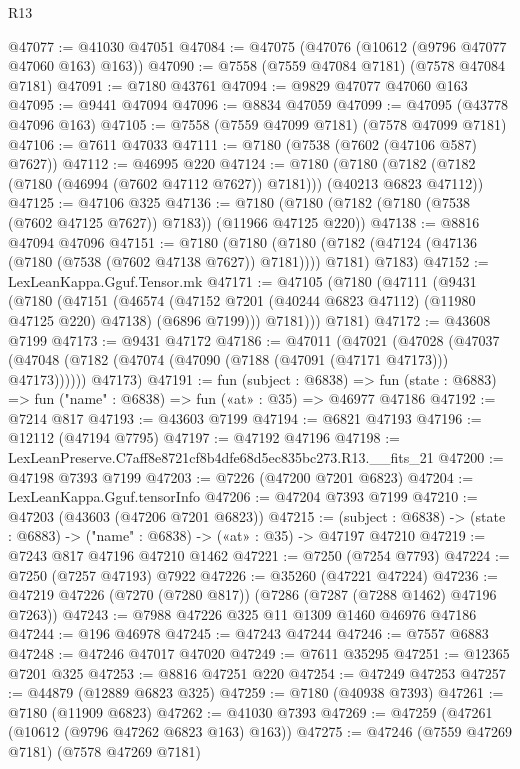 \begin{lexlean}{R13}
\begin{coremodule}
@47077 := @41030 @47051
@47084 := @47075 (@47076 (@10612 (@9796 @47077 @47060 @163) @163))
@47090 := @7558 (@7559 @47084 @7181) (@7578 @47084 @7181)
@47091 := @7180 @43761
@47094 := @9829 @47077 @47060 @163
@47095 := @9441 @47094
@47096 := @8834 @47059
@47099 := @47095 (@43778 @47096 @163)
@47105 := @7558 (@7559 @47099 @7181) (@7578 @47099 @7181)
@47106 := @7611 @47033
@47111 := @7180 (@7538 (@7602 (@47106 @587) @7627))
@47112 := @46995 @220
@47124 := @7180
    (@7180 (@7182 (@7182 (@7180 (@46994 (@7602 @47112 @7627)) @7181))) (@40213 @6823 @47112))
@47125 := @47106 @325
@47136 := @7180 (@7180 (@7182 (@7180 (@7538 (@7602 @47125 @7627)) @7183)) (@11966 @47125 @220))
@47138 := @8816 @47094 @47096
@47151 := @7180
    (@7180 (@7180 (@7182 (@47124 (@47136 (@7180 (@7538 (@7602 @47138 @7627)) @7181)))) @7181) @7183)
@47152 := LexLeanKappa.Gguf.Tensor.mk
@47171 := @47105
    (@7180
      (@47111
        (@9431
          (@7180
            (@47151
              (@46574
                (@47152 @7201 (@40244 @6823 @47112) (@11980 @47125 @220) @47138)
                (@6896 @7199)))
            @7181)))
      @7181)
@47172 := @43608 @7199
@47173 := @9431 @47172
@47186 := @47011
    (@47021
      (@47028 (@47037 (@47048 (@7182 (@47074 (@47090 (@7188 (@47091 (@47171 @47173))) @47173))))))
      @47173)
@47191 := fun (subject : @6838) =>
  fun (state : @6883) => fun ("name" : @6838) => fun («at» : @35) => @46977 @47186
@47192 := @7214 @817
@47193 := @43603 @7199
@47194 := @6821 @47193
@47196 := @12112 (@47194 @7795)
@47197 := @47192 @47196
@47198 := LexLeanPreserve.C7aff8e8721cf8b4dfe68d5ec835bc273.R13.__fits_21
@47200 := @47198 @7393 @7199
@47203 := @7226 (@47200 @7201 @6823)
@47204 := LexLeanKappa.Gguf.tensorInfo
@47206 := @47204 @7393 @7199
@47210 := @47203 (@43603 (@47206 @7201 @6823))
@47215 := (subject : @6838) -> (state : @6883) -> ("name" : @6838) -> («at» : @35) -> @47197 @47210
@47219 := @7243 @817 @47196 @47210 @1462
@47221 := @7250 (@7254 @7793)
@47224 := @7250 (@7257 @47193) @7922
@47226 := @35260 (@47221 @47224)
@47236 := @47219 @47226 (@7270 (@7280 @817)) (@7286 (@7287 (@7288 @1462) @47196 @7263))
@47243 := @7988 @47226 @325 @11 @1309 @1460 @46976 @47186
@47244 := @196 @46978
@47245 := @47243 @47244
@47246 := @7557 @6883
@47248 := @47246 @47017 @47020
@47249 := @7611 @35295
@47251 := @12365 @7201 @325
@47253 := @8816 @47251 @220
@47254 := @47249 @47253
@47257 := @44879 (@12889 @6823 @325)
@47259 := @7180 (@40938 @7393)
@47261 := @7180 (@11909 @6823)
@47262 := @41030 @7393
@47269 := @47259 (@47261 (@10612 (@9796 @47262 @6823 @163) @163))
@47275 := @47246 (@7559 @47269 @7181) (@7578 @47269 @7181)

\end{coremodule}
\end{lexlean}
